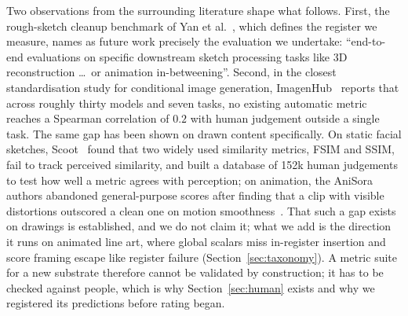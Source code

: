 \documentclass[11pt]{article}
\begin{document}
Two observations from the surrounding literature shape what follows. First,
the rough-sketch cleanup benchmark of Yan et al.~\cite{yan2020cleanup}, which
defines the register we measure, names as future
work precisely the evaluation we undertake: ``end-to-end evaluations on
specific downstream sketch processing tasks like 3D reconstruction \dots\ or
animation in-betweening''. Second, in the closest standardisation study for
conditional image generation, ImagenHub~\cite{ku2023imagenhub}
reports that across roughly thirty models and seven tasks, no existing
automatic metric reaches a Spearman correlation of $0.2$ with human
judgement outside a single task. The same gap has been shown on drawn
content specifically. On static facial sketches, Scoot~\cite{fan2019scoot}
found that two widely used similarity metrics, FSIM and SSIM, fail to track
perceived similarity, and built a database of 152k human judgements to test
how well a metric agrees with perception; on animation, the AniSora authors
abandoned general-purpose scores after finding that a clip with visible
distortions outscored a clean one on motion
smoothness~\cite{jiang2024anisora}. That such a gap exists on drawings is
established, and we do not claim it; what we add is the direction it runs on
animated line art, where global scalars miss in-register insertion and score
framing escape like register failure (Section~\ref{sec:taxonomy}). A metric
suite for a
new substrate therefore cannot be validated by construction; it has to be
checked against people, which is why Section~\ref{sec:human} exists and why
we registered its predictions before rating began.
\end{document}
